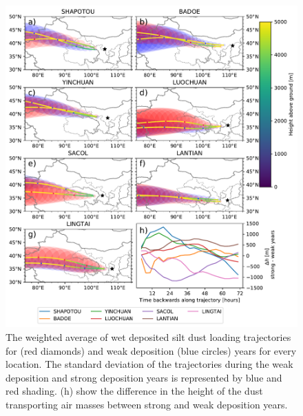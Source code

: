 \begin{figure}[htbp]
    \centering
    \includegraphics[width=\textwidth]{texfiles/figs/20_micron_wetdep_weak_strong_trajecs.pdf}
    \caption{The weighted average of wet deposited silt dust loading trajectories for (red diamonds) and weak deposition (blue circles) years for every location. The standard deviation of the trajectories during the weak deposition and strong deposition years is represented by blue and red shading.  (h) show the difference in the height of the dust transporting air masses between strong and weak deposition years. }
    \label{fig:strong_weak_wetdepo_year_20mmu_trajecs}
\end{figure}

